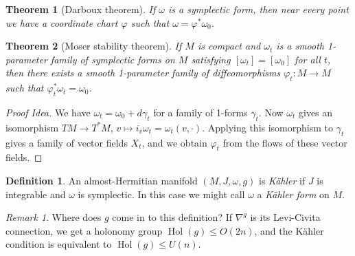 \documentclass[a4paper]{article}
\newtheorem*{theorem}{Theorem}
\theoremstyle{definition}
\newtheorem*{definition}{Definition}
\theoremstyle{remark}
\newtheorem*{remark}{Remark}
\DeclareMathOperator{\Hol}{Hol}
\begin{document}
\begin{theorem}[Darboux theorem]
    If $\omega$ is a symplectic form, then near every point we have a coordinate
    chart $\varphi$ such that $\omega=\varphi^*\omega_0$.
\end{theorem}

\begin{theorem}[Moser stability theorem]
    If $M$ is compact and $\omega_t$ is a smooth 1-parameter family of
    symplectic forms on $M$ satisfying $[\omega_t]=[\omega_0]$ for all $t$, then
    there exists a smooth 1-parameter family of diffeomorphisms
    $\varphi_t:M\to M$ such that $\varphi_t^*\omega_t=\omega_0$.
\end{theorem}

\begin{proof}[Proof Idea]
    We have $\omega_t=\omega_0+d\gamma_t$ for a family of 1-forms $\gamma_t$.
    Now $\omega_t$ gives an isomorphism $TM\to T^*M$,
    $v\mapsto i_v\omega_t=\omega_t(v,\cdot)$. Applying this isomorphism to
    $\gamma_t$ gives a family of vector fields $X_t$, and we obtain $\varphi_t$
    from the flows of these vector fields.
\end{proof}

\begin{definition}
    An almost-Hermitian manifold $(M,J,\omega,g)$ is \emph{K\"ahler} if $J$ is
    integrable and $\omega$ is symplectic. In this case we might call $\omega$ a
    \emph{K\"ahler form} on $M$.
\end{definition}

\begin{remark}
    Where does $g$ come in to this definition? If $\nabla^g$ is its Levi-Civita
    connection, we get a holonomy group $\Hol(g)\le O(2n)$, and the K\"ahler
    condition is equivalent to $\Hol(g)\le U(n)$.
\end{remark}
\end{document}
